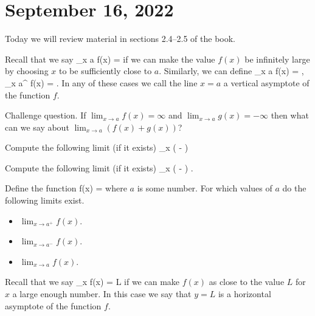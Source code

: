 \documentclass[11pt]{amsart}
\begin{document}
\section*{September 16, 2022}

Today we will review material in sections 2.4--2.5 of the book.

Recall that we say
\beqn
\lim_{x \to a} f(x) = \infty
\eeqn
if we can make the value $f(x)$ be infinitely large by choosing $x$ to be sufficiently close to $a$.
Similarly, we can define 
\beqn
\lim_{x \to a} f(x) = \pm \infty , \quad \lim_{x \to a^{\pm}} f(x) = \pm \infty .
\eeqn
In any of these cases we call the line $x = a$ a vertical asymptote of the function $f$. 

\parsec
Challenge question. 
If $\lim_{x \to a} f(x) = \infty$ and $\lim_{x \to a} g(x) = - \infty$ then what can we say about $\lim_{x \to a} (f(x) + g(x))$? 

\vspace{5cm}

\begin{eg} 
Compute the following limit (if it exists)
\beqn
\lim_{x } \left( - \right) 
\eeqn
\end{eg}

\vspace{5cm}

\begin{eg}
Compute the following limit (if it exists)
\beqn
\lim_{x} \left( - \right) .
\eeqn
\end{eg}
\newpage


\begin{eg}
Define the function
\beqn
f(x) = 
\eeqn
where $a$ is some number.
For which values of $a$ do the following limits exist.
\begin{itemize}
\item $\lim_{x\to a^+} f(x)$.
\item $\lim_{x \to a^-} f(x)$.
\item $\lim_{x\to a} f(x)$. 
\end{itemize}
\end{eg}

\newpage

\parsec[]

Recall that we say 
\beqn
\lim_{x \to \infty} f(x) = L
\eeqn
if we can make $f(x)$ as close to the value $L$ for $x$ a large enough number.
In this case we say that $y=L$ is a horizontal asymptote of the function $f$. 
\end{document}
